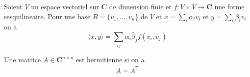 Soient $V$ un espace vectoriel sur $\mathbf{C}$ de dimension finie et $f:V\times V\to \mathbf{C}$ une forme sesquilineaire. Pour une base $B=\{ v_{1},\dots,v_{n} \}$ de $V$ et $x=\sum _{i}\alpha _{i}v_{i}$ et $y=\sum _{i}\beta _{i}v_{i}$ on a
$$
\langle x,y \rangle =\sum _{ij}\alpha _{i}\bar{\beta}_{j}f(v_{i},v_{j})
$$
\begin{definition}
Une matrice $A\in \mathbf{C}^{n\times n}$ est hermitienne si on a
$$
A=\overline{A^{\mathsf{T}}}
$$
\end{definition}
